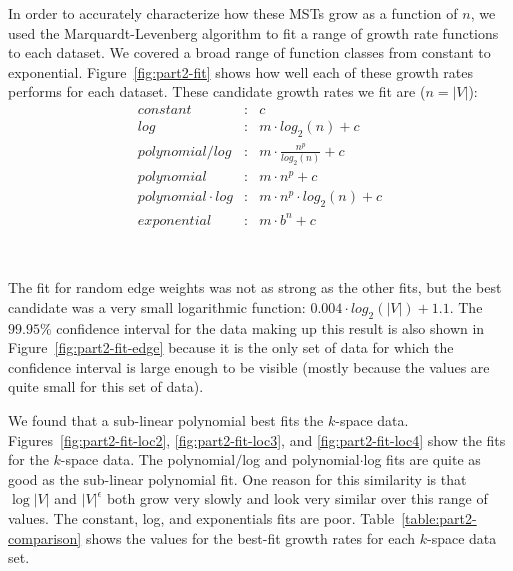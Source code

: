 In order to accurately characterize how these MSTs grow as a function of $n$, we
used the Marquardt-Levenberg algorithm to fit a range of growth rate functions
to each dataset.  We covered a broad range of function classes from constant to
exponential.  Figure~\ref{fig:part2-fit} shows how well each of these growth
rates performs for each dataset.  These candidate growth rates we fit are ($n =
|V|$):
\begin{eqnarray*}
constant&:& c \\
log&:& m \cdot log_2(n) + c \\
polynomial / log&:& m \cdot \frac{n^p}{log_2(n)} + c \\
polynomial&:& m \cdot n^p + c \\
polynomial \cdot log&:& m \cdot n^p \cdot log_2(n) + c \\
exponential&:& m \cdot b^n + c
\end{eqnarray*}

\begin{figure*}[htb!]
\centering
\mbox{
\quad
{}
}
\mbox{
\quad
{}
}
\caption{Comparison of best-fit lines to empirical data.}
\label{fig:part2-fit}
\end{figure*}

The fit for random edge weights was not as strong as the other fits, but the
best candidate was a very small logarithmic function: $0.004 \cdot log_2(|V|) +
1.1$.  The $99.95\%$ confidence interval for the data making up this result is
also shown in Figure~\ref{fig:part2-fit-edge} because it is the only set of data
for which the confidence interval is large enough to be visible (mostly because
the values are quite small for this set of data).

We found that a sub-linear polynomial best fits the $k$-space data.
Figures~\ref{fig:part2-fit-loc2}, \ref{fig:part2-fit-loc3}, and
\ref{fig:part2-fit-loc4} show the fits for the $k$-space data.  The
polynomial$/$log and polynomial$\cdot$log fits are quite as good as the
sub-linear polynomial fit. One reason for this similarity is that $\log |V|$
and $|V|^\epsilon$ both grow very slowly and look very similar over this range
of values. The constant, log, and exponentials fits are poor.
Table~\ref{table:part2-comparison} shows the values for the best-fit growth
rates for each $k$-space data set.

